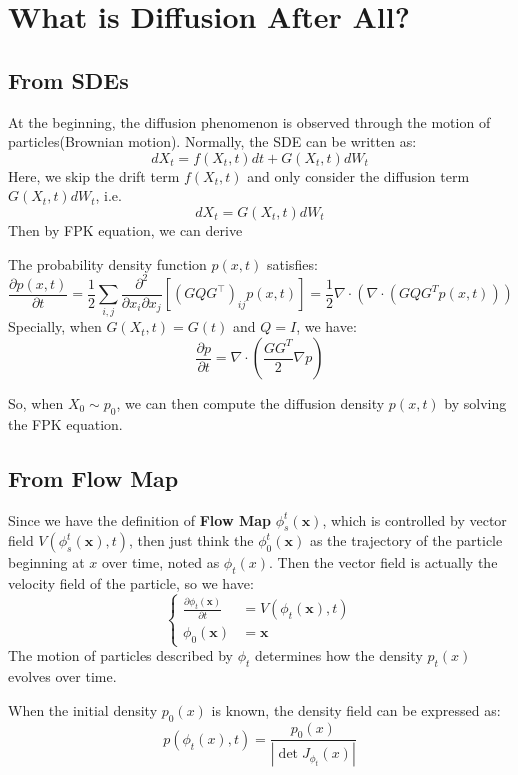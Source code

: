 \section{What is Diffusion After All?}
\subsection{From SDEs}
At the beginning, the diffusion phenomenon is observed through the motion of particles(Brownian motion). 
Normally, the SDE can be written as:
\begin{equation}
    dX_t = f(X_t, t)dt + G(X_t, t)dW_t
\end{equation}
Here, we skip the drift term $f(X_t, t)$ and only consider the diffusion term $G(X_t, t)dW_t$, i.e.
\begin{equation}
    dX_t = G(X_t, t)dW_t
\end{equation}
Then by FPK equation, we can derive 
\begin{theorem}
    The probability density function $p(x, t)$ satisfies:
\begin{equation}
    \frac{\partial p(x, t)}{\partial t} = \frac{1}{2} \sum_{i, j} \frac{\partial^{2}}{\partial x_{i} \partial x_{j}}\left[\left(G Q G^{\top}\right)_{i j} p(x, t)\right]=\frac{1}{2}\nabla \cdot \left(\nabla\cdot (GQG^Tp(x, t))\right)
\end{equation}
Specially, when $G(X_t, t)=G(t)$ and $Q=I$, we have:
\begin{equation}
    \frac{\partial p}{\partial t} = \nabla \cdot \left(\frac{GG^T}{2}\nabla p\right)
\end{equation}
\end{theorem}
So, when $X_0\sim p_0$, we can then compute the diffusion density $p(x, t)$ by solving the FPK equation.
\subsection{From Flow Map}
Since we have the definition of \textbf{Flow Map} $\phi_s^t(\mathbf{x})$, which is controlled by vector field $V(\phi_s^t(\mathbf{x}), t)$, 
then just think the $\phi_0^t(\mathbf{x})$ as the trajectory of the particle beginning at $x$ over time, noted as $\phi_t(x)$.
Then the vector field is actually the velocity field of the particle, so we have:
\begin{equation}\left\{
    \begin{aligned}
        \frac{\partial \phi_t(\mathbf{x})}{\partial t} &= V(\phi_t(\mathbf{x}), t)\\
        \phi_0(\mathbf{x}) &= \mathbf{x}
    \end{aligned}\right.
\end{equation}
The motion of particles described by $\phi_t$ determines how the density $p_t(x)$ evolves over time. 
\begin{theorem}
    When the initial density $p_0(x)$ is known, the density field can be expressed as:
\begin{equation}
    p(\phi_t(x), t) = \frac{p_0(x)}{\left|\det J_{\phi_t}(x)\right|}
\end{equation}
\end{theorem}

